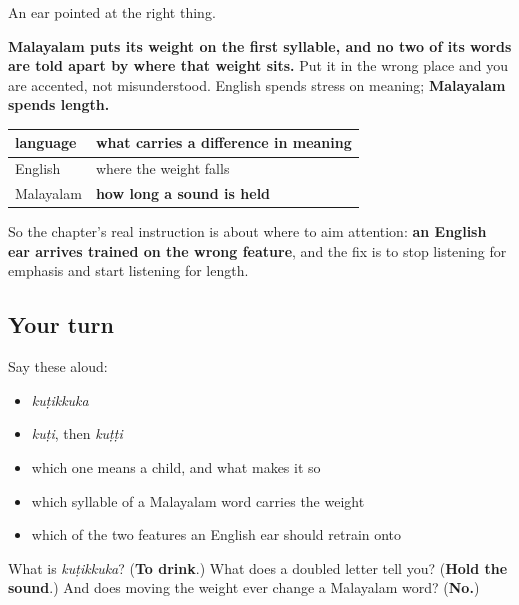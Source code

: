\begin{grammarlens}[title={What you've built}]
An ear pointed at the right thing.

\textbf{Malayalam puts its weight on the first syllable, and no two of its words are told apart by where that weight sits.} Put it in the wrong place and you are accented, not misunderstood. English spends stress on meaning; \textbf{Malayalam spends length.}

\noindent
\begin{tabularx}{\linewidth}{@{}>{\raggedright\arraybackslash}X>{\raggedright\arraybackslash}X@{}}
\toprule
\textbf{language} & \textbf{what carries a difference in meaning} \\
\midrule
English & where the weight falls \\
Malayalam & \textbf{how long a sound is held} \\
\bottomrule
\end{tabularx}

So the chapter's real instruction is about where to aim attention: \textbf{an English ear arrives trained on the wrong feature}, and the fix is to stop listening for emphasis and start listening for length.
\end{grammarlens}

\subsection*{Your turn}
Say these aloud:

\begin{itemize}
\raggedright
  \item \emph{kuṭikkuka}
  \item \emph{kuṭi}, then \emph{kuṭṭi}
  \item which one means a child, and what makes it so
  \item which syllable of a Malayalam word carries the weight
  \item which of the two features an English ear should retrain onto
\end{itemize}

\begin{tcolorbox}[breakable,colback=teal!4,colframe=teal!35!black,title={Before you move on}]
What is \emph{kuṭikkuka}? (\textbf{To drink}.) What does a doubled letter tell you? (\textbf{Hold the sound}.) And does moving the weight ever change a Malayalam word? (\textbf{No.})
\end{tcolorbox}
